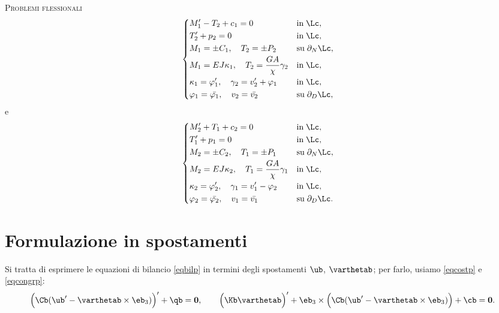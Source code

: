  \noindent\textsc{Problemi flessionali}\\
 \begin{equation}
 	\begin{cases}
 		\begin{aligned}
 			& M_1'-T_2+c_1=0 \qquad &&\textrm{in}\; \Lc,\\
 			& T'_2+p_2=0 \qquad &&\textrm{in}\; \Lc,\\
 			& M_1=\pm C_1, \quad T_2=\pm P_2 &&\textrm{su}\; \partial_N\Lc,\\
 			& M_1=EJ\kappa_1, \quad T_2=\frac{GA}{\chi}\gamma_2&&\textrm{in}\; \Lc,\\
 			& \kappa_1=\varphi_1', \quad \gamma_2=v_2'+\varphi_1 &&\textrm{in}\; \Lc,\\
 			& \varphi_1=\bar{\varphi_1}, \quad v_2=\bar{v_2} &&\textrm{su}\; \partial_D\Lc,\\
 		\end{aligned} 
 	\end{cases}
 \end{equation}
 e 
 \begin{equation}
 	\begin{cases}
 		\begin{aligned}
 			& M_2'+T_1+c_2=0 \qquad &&\textrm{in}\; \Lc,\\
 			& T'_1+p_1=0 \qquad &&\textrm{in}\; \Lc,\\
 			& M_2=\pm C_2, \quad T_1=\pm P_1 &&\textrm{su}\; \partial_N\Lc,\\
 			& M_2=EJ\kappa_2, \quad T_1=\frac{GA}{\chi}\gamma_1&&\textrm{in}\; \Lc,\\
 			& \kappa_2=\varphi_2', \quad \gamma_1=v_1'-\varphi_2 &&\textrm{in}\; \Lc,\\
 			& \varphi_2=\bar{\varphi_2}, \quad v_1=\bar{v_1} &&\textrm{su}\; \partial_D\Lc.\\
 		\end{aligned} 
 	\end{cases}
 \end{equation}



\section{Formulazione in spostamenti}
Si tratta di esprimere le equazioni di bilancio \eqref{eqbilp} in termini degli spostamenti $\ub$, $\varthetab$; per farlo, usiamo \eqref{eqcostp} e \eqref{eqcongrp}:
\begin{equation}
\Big(\Cb (\ub'-\varthetab\times \eb_3)\Big)'+\qb =\mathbf{0}, \qquad \Big(\Kb \varthetab\Big)'+\eb_3\times \Big(\Cb (\ub'-\varthetab\times \eb_3)\Big)+\cb=\mathbf{0}.
\end{equation}

